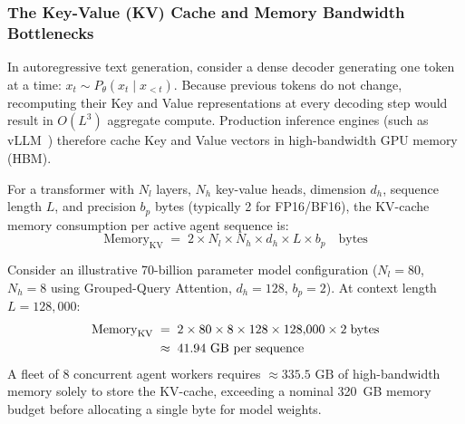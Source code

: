 \subsubsection{The Key-Value (KV) Cache and Memory Bandwidth Bottlenecks}
In autoregressive text generation, consider a dense decoder generating one token at a time: $x_{t} \sim P_\theta(x_t \mid x_{<t})$. Because previous tokens do not change, recomputing their Key and Value representations at every decoding step would result in $O(L^3)$ aggregate compute. Production inference engines (such as vLLM~) therefore cache Key and Value vectors in high-bandwidth GPU memory (HBM).

For a transformer with $N_l$ layers, $N_h$ key-value heads, dimension $d_h$, sequence length $L$, and precision $b_p$ bytes (typically 2 for FP16/BF16), the KV-cache memory consumption per active agent sequence is:
\begin{equation}\label{eq:kv-cache-full}
\mathrm{Memory}_{\mathrm{KV}} \;=\; 2 \times N_l \times N_h \times d_h \times L \times b_p \quad \text{bytes}
\end{equation}

Consider an illustrative 70-billion parameter model configuration ($N_l = 80$, $N_h = 8$ using Grouped-Query Attention, $d_h = 128$, $b_p = 2$). At context length $L = 128{,}000$:
\begin{align}
\mathrm{Memory}_{\mathrm{KV}} &\;=\; 2 \times 80 \times 8 \times 128 \times 128{,}000 \times 2 \;\text{bytes} \notag \\
&\;\approx\; 41.94\text{ GB per sequence}
\end{align}
A fleet of 8 concurrent agent workers requires $\approx 335.5\text{ GB}$ of high-bandwidth memory solely to store the KV-cache, exceeding a nominal 320~GB memory budget before allocating a single byte for model weights.

